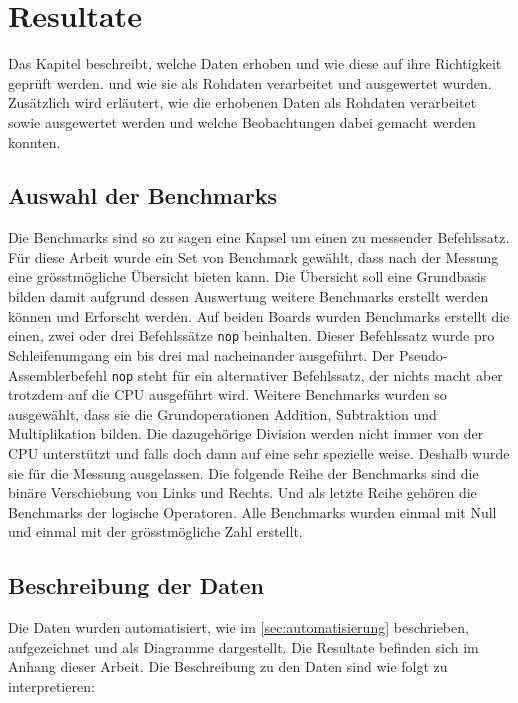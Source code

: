\chapter{Resultate}

Das Kapitel beschreibt, welche Daten erhoben und wie diese auf ihre Richtigkeit geprüft werden. und wie sie als Rohdaten verarbeitet und ausgewertet wurden. Zusätzlich wird erläutert, wie die erhobenen Daten als Rohdaten verarbeitet sowie ausgewertet werden und welche Beobachtungen dabei gemacht werden konnten.


\section{Auswahl der Benchmarks}

Die Benchmarks sind so zu sagen eine Kapsel um einen zu messender Befehlssatz. Für diese Arbeit wurde ein Set von Benchmark gewählt, dass nach der Messung eine grösstmögliche Übersicht bieten kann. Die Übersicht soll eine Grundbasis bilden damit aufgrund dessen Auswertung weitere Benchmarks erstellt werden können und Erforscht werden. Auf beiden Boards wurden Benchmarks erstellt die einen, zwei oder drei Befehlssätze \texttt{nop} beinhalten. Dieser Befehlssatz wurde pro Schleifenumgang ein bis drei mal nacheinander ausgeführt. Der Pseudo-Assemblerbefehl \texttt{nop} steht für ein alternativer Befehlssatz, der nichts macht aber trotzdem auf die CPU ausgeführt wird. Weitere Benchmarks wurden so ausgewählt, dass sie die Grundoperationen Addition, Subtraktion und Multiplikation bilden. Die dazugehörige Division werden nicht immer von der CPU unterstützt und falls doch dann auf eine sehr spezielle weise. Deshalb wurde sie für die Messung ausgelassen. Die folgende Reihe der Benchmarks sind die binäre Verschiebung von Links und Rechts. Und als letzte Reihe gehören die Benchmarks der logische Operatoren. Alle Benchmarks wurden einmal mit Null und einmal mit der grösstmögliche Zahl erstellt.




\section{Beschreibung der Daten}

Die Daten wurden automatisiert, wie im \autoref{sec:automatisierung} beschrieben, aufgezeichnet und als Diagramme dargestellt. Die Resultate befinden sich im Anhang dieser Arbeit. Die Beschreibung zu den Daten sind wie folgt zu interpretieren:

